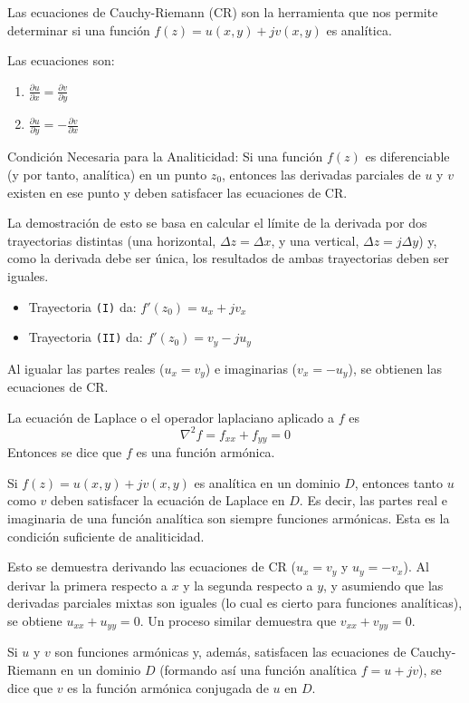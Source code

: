 \begin{tcolorbox}[title=Ecuaciones de Cauchy-Riemann,resumen]
Las ecuaciones de Cauchy-Riemann (CR) son la herramienta que nos permite determinar si una función $f(z) = u(x, y) + jv(x, y)$ es analítica.

Las ecuaciones son:
\begin{enumerate}
  \item $\frac{\partial u}{\partial x} = \frac{\partial v}{\partial y}$
  \item $\frac{\partial u}{\partial y} = -\frac{\partial v}{\partial x}$
\end{enumerate}

\tcblower

Condición Necesaria para la Analiticidad: Si una función $f(z)$ es diferenciable (y por tanto, analítica) en un punto $z_0$, entonces las derivadas parciales de $u$ y $v$ existen en ese punto y deben satisfacer las ecuaciones de CR.

La demostración de esto se basa en calcular el límite de la derivada por dos trayectorias distintas (una horizontal, $\Delta z = \Delta x$, y una vertical, $\Delta z = j\Delta y$) y, como la derivada debe ser única, los resultados de ambas trayectorias deben ser iguales.
\begin{itemize}
  \item Trayectoria \texttt{(I)} da: $f'(z_0) = u_x + jv_x$
  \item Trayectoria \texttt{(II)} da: $f'(z_0) = v_y - ju_y$
\end{itemize}
Al igualar las partes reales ($u_x = v_y$) e imaginarias ($v_x = -u_y$), se obtienen las ecuaciones de CR.
\end{tcolorbox}

\begin{tcolorbox}[title=Función armónica,resumen]
  La ecuación de Laplace o el operador laplaciano aplicado a $f$ es 
  $$
  \nabla^2 f=f_{xx}+f_{yy}=0
  $$
  Entonces se dice que $f$ es una función armónica.

  \tcblower

  Si $f(z) = u(x,y) + jv(x,y)$ es analítica en un dominio $D$, entonces tanto $u$ como $v$ deben satisfacer la ecuación de Laplace en $D$. Es decir, las partes real e imaginaria de una función analítica son siempre funciones armónicas. Esta es la condición suficiente de analiticidad.

  Esto se demuestra derivando las ecuaciones de CR ($u_x = v_y$ y $u_y = -v_x$). Al derivar la primera respecto a $x$ y la segunda respecto a $y$, y asumiendo que las derivadas parciales mixtas son iguales (lo cual es cierto para funciones analíticas), se obtiene $u_{xx} + u_{yy} = 0$. Un proceso similar demuestra que $v_{xx} + v_{yy} = 0$.
\end{tcolorbox}

\begin{tcolorbox}[title=Armónica conjugada,resumen]
  Si $u$ y $v$ son funciones armónicas y, además, satisfacen las ecuaciones de Cauchy-Riemann en un dominio $D$ (formando así una función analítica $f = u + jv$), se dice que $v$ es la función armónica conjugada de $u$ en $D$.
\end{tcolorbox}

